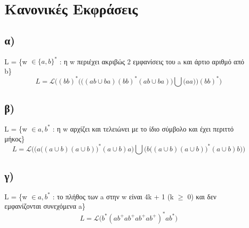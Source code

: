 \section{Κανονικές Εκφράσεις}

\subsection[Ερώτημα α]{\textbf{α) }} L = \{w $\in \{a, b\}^*$ : η w περιέχει ακριβώς 2 εμφανίσεις του a και άρτιο αριθμό από b\}
\begin{equation*}
	L = \mathcal{L} \Bigg( (bb)^* \bigg( \Big( (ab \cup ba) (bb)^*(ab \cup ba) \Big)  \bigcup    \Big(aa\Big)  \bigg) (bb)^*\Bigg)
\end{equation*}

\subsection[Ερώτημα β]{\textbf{β) }} L = \{w $\in {a, b}^*$ : η w αρχίζει και τελειώνει με το ίδιο σύμβολο και έχει περιττό μήκος\}
\begin{equation*}
	L = \mathcal{L} \Bigg( \bigg(  a \Big( (a \cup b)(a \cup b) \Big)^* (a \cup b) a \bigg)  \bigcup   \bigg( b \Big( (a \cup b)(a \cup b) \Big)^* (a \cup b) b \bigg) \Bigg)
\end{equation*}

\subsection[Ερώτημα γ]{\textbf{γ) }} L = \{w $\in {a, b}^*$ : το πλήθος των a στην w είναι 4k + 1 (k $\geq$ 0) και δεν εμφανίζονται συνεχόμενα a\}
\begin{equation*}
	L = \mathcal{L} \bigg( b^*(a b^+a b^+a b^+a b^+)^*ab^* \bigg)
\end{equation*}




